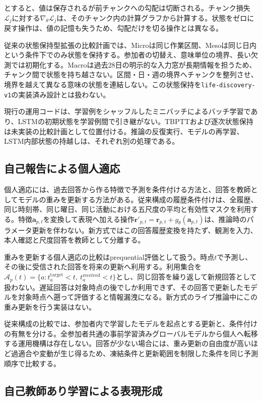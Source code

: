 とすると、値は保存されるが前チャンクへの勾配は切断される。チャンク損失\(\mathcal{L}_j\)に対する\(\nabla_\theta\mathcal{L}_j\)は、そのチャンク内の計算グラフから計算する。状態をゼロに戻す操作は、値の記憶も失うため、勾配だけを切る操作とは異なる。

従来の状態保持型拡張の比較計画では、Microは同じ作業区間、Mesoは同じ日内という条件下でのみ状態を保持する。参加者の切替え、意味単位の境界、長い欠測では初期化する。Macroは過去28日の明示的な入力窓が長期情報を担うため、チャンク間で状態を持ち越さない。区間・日・週の境界へチャンクを整列させ、境界を越えて異なる意味の状態を連結しない。この状態保持を\texttt{life-discovery-v1}の実装済み設計とは扱わない。

現行の運用コードは、学習例をシャッフルしたミニバッチによるバッチ学習であり、LSTMの初期状態を学習例間で引き継がない。TBPTTおよび逐次状態保持は未実装の比較計画として位置付ける。推論の反復実行、モデルの再学習、LSTM内部状態の持越しは、それぞれ別の処理である。

\subsection{自己報告による個人適応}

個人適応には、過去回答から作る特徴で予測を条件付ける方法と、回答を教師としてモデルの重みを更新する方法がある。従来構成の履歴条件付けは、全履歴、同じ時刻帯、同じ曜日、同じ活動における五尺度の平均と有効性マスクを利用する。特徴\(\boldsymbol{a}_{p,t}\)を変換して表現へ加える操作\(\boldsymbol{r}'_{p,t}=\boldsymbol{r}_{p,t}+g_\theta(\boldsymbol{a}_{p,t})\)は、推論時のパラメータ更新を伴わない。新方式ではこの回答履歴変換を持たず、観測を入力、本人確認と尺度回答を教師として分離する。

重みを更新する個人適応の比較はprequential評価として扱う。時点\(t\)で予測し、その後に受信された回答を将来の更新へ利用する。利用集合を\(\mathcal{A}_p(t)=\{a:t_a^{\mathrm{target}}<t,\ t_a^{\mathrm{received}}<t\}\)とし、同じ回答を繰り返して新規回答として扱わない。遅延回答は対象時点の後でしか利用できず、その回答で更新したモデルを対象時点へ遡って評価すると情報漏洩になる。新方式のライブ推論中にこの重み更新を行う実装はない。

従来構成の比較では、参加者内で学習したモデルを起点とする更新と、条件付けの有無を分ける。全参加者共通の事前学習済みグローバルモデルから個人へ転移する運用機構は存在しない。回答が少ない場合には、重み更新の自由度が高いほど過適合や変動が生じ得るため、凍結条件と更新範囲を制限した条件を同じ予測順序で比較する。

\subsection{自己教師あり学習による表現形成}


